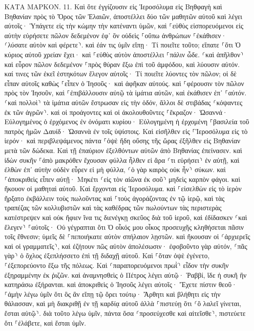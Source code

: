 \documentclass[twoside, 9pt]{extreport}
\begin{document}
ΚΑΤΑ ΜΑΡΚΟΝ.
11.
Καὶ ὅτε ἐγγίζουσιν εἰς Ἱεροσόλυμα εἰς Βηθφαγὴ καὶ Βηθανίαν πρὸς τὸ Ὄρος τῶν Ἐλαιῶν, ἀποστέλλει δύο τῶν μαθητῶν αὐτοῦ 
καὶ λέγει αὐτοῖς· Ὑπάγετε εἰς τὴν κώμην τὴν κατέναντι ὑμῶν, καὶ ⸀εὐθὺς εἰσπορευόμενοι εἰς αὐτὴν εὑρήσετε πῶλον δεδεμένον ἐφ᾽ ὃν οὐδεὶς ⸀οὔπω ἀνθρώπων ⸀ἐκάθισεν· ⸂λύσατε αὐτὸν καὶ φέρετε⸃. 
καὶ ἐάν τις ὑμῖν εἴπῃ· Τί ποιεῖτε τοῦτο; εἴπατε ⸀ὅτι Ὁ κύριος αὐτοῦ χρείαν ἔχει· καὶ ⸀εὐθὺς αὐτὸν ἀποστέλλει ⸀πάλιν ὧδε. 
⸂καὶ ἀπῆλθον⸃ καὶ εὗρον πῶλον δεδεμένον ⸀πρὸς θύραν ἔξω ἐπὶ τοῦ ἀμφόδου, καὶ λύουσιν αὐτόν. 
καί τινες τῶν ἐκεῖ ἑστηκότων ἔλεγον αὐτοῖς· Τί ποιεῖτε λύοντες τὸν πῶλον; 
οἱ δὲ εἶπαν αὐτοῖς καθὼς ⸀εἶπεν ὁ Ἰησοῦς· καὶ ἀφῆκαν αὐτούς. 
καὶ ⸀φέρουσιν τὸν πῶλον πρὸς τὸν Ἰησοῦν, καὶ ⸀ἐπιβάλλουσιν αὐτῷ τὰ ἱμάτια αὐτῶν, καὶ ἐκάθισεν ἐπ᾽ ⸀αὐτόν. 
⸂καὶ πολλοὶ⸃ τὰ ἱμάτια αὐτῶν ἔστρωσαν εἰς τὴν ὁδόν, ἄλλοι δὲ στιβάδας ⸂κόψαντες ἐκ τῶν ἀγρῶν⸃. 
καὶ οἱ προάγοντες καὶ οἱ ἀκολουθοῦντες ⸀ἔκραζον· Ὡσαννά· Εὐλογημένος ὁ ἐρχόμενος ἐν ὀνόματι κυρίου· 
Εὐλογημένη ἡ ἐρχομένη ⸀βασιλεία τοῦ πατρὸς ἡμῶν Δαυίδ· Ὡσαννὰ ἐν τοῖς ὑψίστοις. 
Καὶ εἰσῆλθεν εἰς ⸀Ἱεροσόλυμα εἰς τὸ ἱερόν· καὶ περιβλεψάμενος πάντα ⸀ὀψὲ ἤδη οὔσης τῆς ὥρας ἐξῆλθεν εἰς Βηθανίαν μετὰ τῶν δώδεκα. 
Καὶ τῇ ἐπαύριον ἐξελθόντων αὐτῶν ἀπὸ Βηθανίας ἐπείνασεν. 
καὶ ἰδὼν συκῆν ⸀ἀπὸ μακρόθεν ἔχουσαν φύλλα ἦλθεν εἰ ἄρα ⸂τι εὑρήσει⸃ ἐν αὐτῇ, καὶ ἐλθὼν ἐπ᾽ αὐτὴν οὐδὲν εὗρεν εἰ μὴ φύλλα, ⸂ὁ γὰρ καιρὸς οὐκ ἦν⸃ σύκων. 
καὶ ⸀ἀποκριθεὶς εἶπεν αὐτῇ· Μηκέτι ⸂εἰς τὸν αἰῶνα ἐκ σοῦ⸃ μηδεὶς καρπὸν φάγοι. καὶ ἤκουον οἱ μαθηταὶ αὐτοῦ. 
Καὶ ἔρχονται εἰς Ἱεροσόλυμα. καὶ ⸀εἰσελθὼν εἰς τὸ ἱερὸν ἤρξατο ἐκβάλλειν τοὺς πωλοῦντας καὶ ⸀τοὺς ἀγοράζοντας ἐν τῷ ἱερῷ, καὶ τὰς τραπέζας τῶν κολλυβιστῶν καὶ τὰς καθέδρας τῶν πωλούντων τὰς περιστερὰς κατέστρεψεν 
καὶ οὐκ ἤφιεν ἵνα τις διενέγκῃ σκεῦος διὰ τοῦ ἱεροῦ, 
καὶ ἐδίδασκεν ⸂καὶ ἔλεγεν⸃ ⸀αὐτοῖς· Οὐ γέγραπται ὅτι Ὁ οἶκός μου οἶκος προσευχῆς κληθήσεται πᾶσιν τοῖς ἔθνεσιν; ὑμεῖς δὲ ⸀πεποιήκατε αὐτὸν σπήλαιον λῃστῶν. 
καὶ ἤκουσαν οἱ ⸂ἀρχιερεῖς καὶ οἱ γραμματεῖς⸃, καὶ ἐζήτουν πῶς αὐτὸν ἀπολέσωσιν· ἐφοβοῦντο γὰρ αὐτόν, ⸂πᾶς γὰρ⸃ ὁ ὄχλος ἐξεπλήσσετο ἐπὶ τῇ διδαχῇ αὐτοῦ. 
Καὶ ⸀ὅταν ὀψὲ ἐγένετο, ⸀ἐξεπορεύοντο ἔξω τῆς πόλεως. 
Καὶ ⸂παραπορευόμενοι πρωῒ⸃ εἶδον τὴν συκῆν ἐξηραμμένην ἐκ ῥιζῶν. 
καὶ ἀναμνησθεὶς ὁ Πέτρος λέγει αὐτῷ· Ῥαββί, ἴδε ἡ συκῆ ἣν κατηράσω ἐξήρανται. 
καὶ ἀποκριθεὶς ὁ Ἰησοῦς λέγει αὐτοῖς· Ἔχετε πίστιν θεοῦ· 
⸀ἀμὴν λέγω ὑμῖν ὅτι ὃς ἂν εἴπῃ τῷ ὄρει τούτῳ· Ἄρθητι καὶ βλήθητι εἰς τὴν θάλασσαν, καὶ μὴ διακριθῇ ἐν τῇ καρδίᾳ αὐτοῦ ἀλλὰ ⸀πιστεύῃ ὅτι ⸂ὃ λαλεῖ γίνεται, ἔσται αὐτῷ⸃. 
διὰ τοῦτο λέγω ὑμῖν, πάντα ὅσα ⸂προσεύχεσθε καὶ αἰτεῖσθε⸃, πιστεύετε ὅτι ⸀ἐλάβετε, καὶ ἔσται ὑμῖν. 
\end{document}

